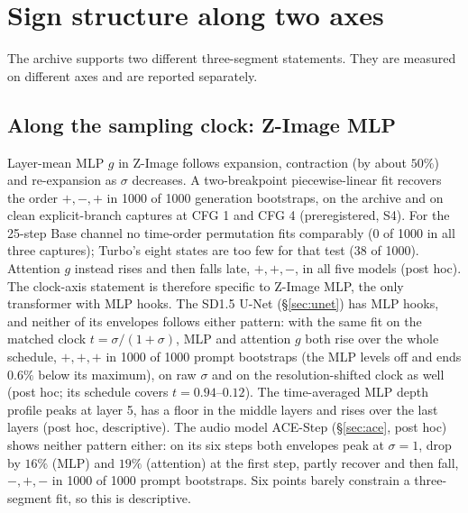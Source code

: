 \documentclass[11pt]{article}
\begin{document}
\section{Sign structure along two axes}\label{sec:topology}

The archive supports two different three-segment statements. They are measured on different axes and are reported separately.

\subsection{Along the sampling clock: Z-Image MLP}
Layer-mean MLP $g$ in Z-Image follows expansion, contraction (by about $50\%$) and re-expansion as $\sigma$ decreases. A two-breakpoint piecewise-linear fit \citep{muggeo2003estimating} recovers the order $+,-,+$ in 1000 of 1000 generation bootstraps, on the archive and on clean explicit-branch captures at CFG 1 and CFG 4 (preregistered, S4). For the 25-step Base channel no time-order permutation fits comparably (0 of 1000 in all three captures); Turbo's eight states are too few for that test (38 of 1000). Attention $g$ instead rises and then falls late, $+,+,-$, in all five models (post hoc). The clock-axis statement is therefore specific to Z-Image MLP, the only transformer with MLP hooks. The SD1.5 U-Net (\S\ref{sec:unet}) has MLP hooks, and neither of its envelopes follows either pattern: with the same fit on the matched clock $t=\sigma/(1+\sigma)$, MLP and attention $g$ both rise over the whole schedule, $+,+,+$ in 1000 of 1000 prompt bootstraps (the MLP levels off and ends $0.6\%$ below its maximum), on raw $\sigma$ and on the resolution-shifted clock as well (post hoc; its schedule covers $t=0.94$--$0.12$). The time-averaged MLP depth profile peaks at layer 5, has a floor in the middle layers and rises over the last layers (post hoc, descriptive). The audio model ACE-Step (\S\ref{sec:ace}, post hoc) shows neither pattern either: on its six steps both envelopes peak at $\sigma=1$, drop by $16\%$ (MLP) and $19\%$ (attention) at the first step, partly recover and then fall, $-,+,-$ in 1000 of 1000 prompt bootstraps. Six points barely constrain a three-segment fit, so this is descriptive.
\end{document}

